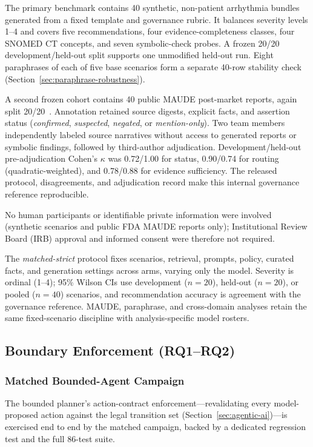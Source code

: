 \documentclass[journal,twoside,web]{ieeecolor}
\begin{document}
The primary benchmark contains 40 synthetic, non-patient arrhythmia bundles generated from a fixed template and governance rubric. It balances severity levels 1--4 and covers five recommendations, four evidence-completeness classes, four SNOMED CT concepts, and seven symbolic-check probes. A frozen 20/20 development/held-out split supports one unmodified held-out run. Eight paraphrases of each of five base scenarios form a separate 40-row stability check (Section~\ref{sec:paraphrase-robustness}).

A second frozen cohort contains 40 public MAUDE post-market reports, again split 20/20~\cite{fda_maude}. Annotation retained source digests, explicit facts, and assertion status (\textit{confirmed}, \textit{suspected}, \textit{negated}, or \textit{mention-only}). Two team members independently labeled source narratives without access to generated reports or symbolic findings, followed by third-author adjudication. Development/held-out pre-adjudication Cohen's $\kappa$ was 0.72/1.00 for status, 0.90/0.74 for routing (quadratic-weighted), and 0.78/0.88 for evidence sufficiency. The released protocol, disagreements, and adjudication record make this internal governance reference reproducible.

No human participants or identifiable private information were involved (synthetic scenarios and public FDA MAUDE reports only); Institutional Review Board (IRB) approval and informed consent were therefore not required.

The \textit{matched-strict} protocol fixes scenarios, retrieval, prompts, policy, curated facts, and generation settings across arms, varying only the model. Severity is ordinal (1--4); 95\% Wilson CIs use development ($n=20$), held-out ($n=20$), or pooled ($n=40$) scenarios, and recommendation accuracy is agreement with the governance reference. MAUDE, paraphrase, and cross-domain analyses retain the same fixed-scenario discipline with analysis-specific model rosters.

\subsection{Boundary Enforcement (RQ1--RQ2)}
\label{sec:rq1-rq2-boundary}

\subsubsection{Matched Bounded-Agent Campaign}

The bounded planner's action-contract enforcement---revalidating every model-proposed action against the legal transition set (Section~\ref{sec:agentic-ai})---is exercised end to end by the matched campaign, backed by a dedicated regression test and the full 86-test suite.
\end{document}

